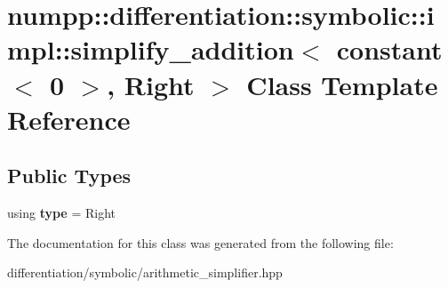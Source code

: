 \hypertarget{classnumpp_1_1differentiation_1_1symbolic_1_1impl_1_1simplify__addition_3_01constant_3_010_01_4_00_01Right_01_4}{}\section{numpp\+:\+:differentiation\+:\+:symbolic\+:\+:impl\+:\+:simplify\+\_\+addition$<$ constant$<$ 0 $>$, Right $>$ Class Template Reference}
\label{classnumpp_1_1differentiation_1_1symbolic_1_1impl_1_1simplify__addition_3_01constant_3_010_01_4_00_01Right_01_4}
\subsection*{Public Types}
\begin{DoxyCompactItemize}
\item 
\mbox{\label{classnumpp_1_1differentiation_1_1symbolic_1_1impl_1_1simplify__addition_3_01constant_3_010_01_4_00_01Right_01_4_a262ebf79e026ad8e514bd487ef2c5a61}} 
using {\bfseries type} = Right
\end{DoxyCompactItemize}


The documentation for this class was generated from the following file\+:\begin{DoxyCompactItemize}
\item 
differentiation/symbolic/arithmetic\+\_\+simplifier.\+hpp\end{DoxyCompactItemize}
